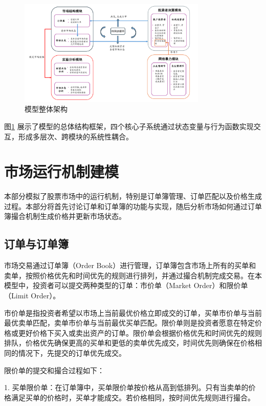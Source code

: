 \begin{figure}[h]
    \centering
    \includegraphics[width=0.8\textwidth]{image/3-1_structure.pdf}
    \caption{模型整体架构}
    \label{fig:architecture}
\end{figure}

图\ref{fig:architecture} 展示了模型的总体结构框架，四个核心子系统通过状态变量与行为函数实现交互，形成多层次、跨模块的系统性耦合。








\section{市场运行机制建模}

本部分模拟了股票市场中的运行机制，特别是订单簿管理、订单匹配以及价格生成过程。本部分将首先讨论订单和订单簿的功能与实现，随后分析市场如何通过订单簿撮合机制生成价格并更新市场状态。

\subsection{订单与订单簿}


市场交易通过订单簿（Order Book）进行管理，订单簿包含市场上所有的买单和卖单，按照价格优先和时间优先的规则进行排列，并通过撮合机制完成交易。在本模型中，投资者可以提交两种类型的订单：市价单（Market Order）和限价单（Limit Order）。

市价单是指投资者希望以市场上当前最优价格立即成交的订单，买单市价单与当前最优卖单匹配，卖单市价单与当前最优买单匹配。限价单则是投资者愿意在特定价格或更好价格下买入或卖出资产的订单。限价单会根据价格优先和时间优先的规则排队，价格优先确保更高的买单和更低的卖单优先成交，时间优先则确保在价格相同的情况下，先提交的订单优先成交。

限价单的提交和撮合过程如下：

1. 买单限价单：在订单簿中，买单限价单按价格从高到低排列。只有当卖单的价格满足买单的价格时，买单才能成交。若价格相同，按时间优先规则进行撮合。

